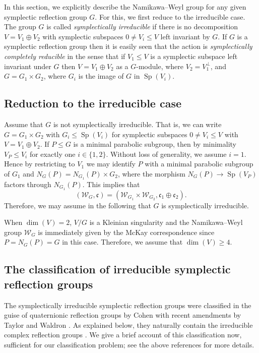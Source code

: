 \documentclass[10pt,a4paper]{amsart}
\DeclareMathOperator{\Sp}{Sp}
\begin{document}
In this section, we explicitly describe the Namikawa--Weyl group for any given symplectic reflection group \(G\).
For this, we first reduce to the irreducible case.
The group \(G\) is called \emph{symplectically irreducible} if there is no decomposition \(V = V_1\oplus V_2\) with symplectic subspaces \(0\neq V_i\leqslant V\) left invariant by \(G\). If $G$ is a symplectic reflection group then it is easily seen that the action is \emph{symplectically completely reducible} in the sense that if $V_1 \leqslant V$ is a symplectic subspace left invariant under $G$ then $V = V_1 \oplus V_2$ as a $G$-module, where $V_2 = V_1^{\perp}$, and $G = G_1 \times G_2$, where $G_i$ is the image of $G$ in $\Sp(V_i)$. 

\subsection{Reduction to the irreducible case}
Assume that \(G\) is not symplectically irreducible. That is, we can write \(G = G_1\times G_2\) with \(G_i\leqslant\Sp(V_i)\) for symplectic subspaces \(0\neq V_i\leqslant V\) with \(V = V_1 \oplus V_2\). If \(P\leqslant G\) is a minimal parabolic subgroup, then by minimality \(V_P \leqslant V_i\) for exactly one \(i\in \{1, 2\}\). Without loss of generality, we assume \(i = 1\).
Hence by restricting to \(V_1\) we may identify \(P\) with a minimal parabolic subgroup of \(G_1\) and $N_G(P) = N_{G_1}(P) \times G_2$, where the morphism $N_G(P) \to \Sp(V_P)$ factors through $N_{G_1}(P)$. This implies that 
\[
(\mathcal{W}_G,\mathfrak{c}) = (\mathcal{W}_{G_1} \times \mathcal{W}_{G_2},\mathfrak{c}_1 \oplus \mathfrak{c}_2).
\]
Therefore, we may assume in the following that \(G\) is symplectically irreducible.

When \(\dim(V) = 2\), \(V/G\) is a Kleinian singularity and the Namikawa--Weyl group \(\mathcal W_G\) is immediately given by the McKay correspondence since $P = N_G(P) = G$ in this case. Therefore, we assume that \(\dim(V) \geqslant 4\).

\subsection{The classification of irreducible symplectic reflection groups}
The symplectically irreducible symplectic reflection groups were classified in the guise of quaternionic reflection groups by Cohen \cite{Coh80} with recent amendments by Taylor \cite{Tay25} and Waldron \cite{Wal25}.
As explained below, they naturally contain the irreducible complex reflection groups \cite{ST54}. We give a brief account of this classification now, sufficient for our classification problem; see the above references for more details.
\end{document}
